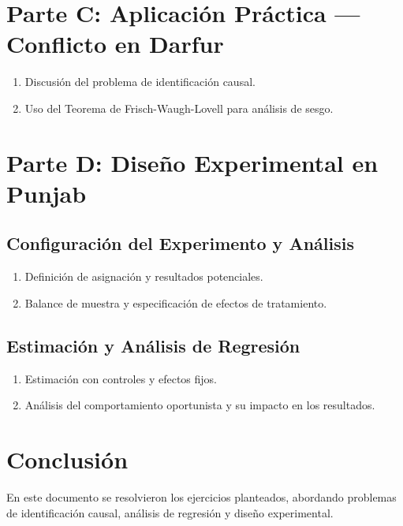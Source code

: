 \documentclass[12pt, letter]{article}
\begin{document}
               








                




\section{Parte C: Aplicación Práctica — Conflicto en Darfur}
\begin{enumerate}[label=C.\arabic*]
    \item Discusión del problema de identificación causal.
    \item Uso del Teorema de Frisch-Waugh-Lovell para análisis de sesgo.
\end{enumerate}




\section{Parte D: Diseño Experimental en Punjab}
\subsection{Configuración del Experimento y Análisis}
\begin{enumerate}[label=D.\arabic*]
    \item Definición de asignación y resultados potenciales.
    \item Balance de muestra y especificación de efectos de tratamiento.
\end{enumerate}

\subsection{Estimación y Análisis de Regresión}
\begin{enumerate}[label=D.\arabic*]
    \item Estimación con controles y efectos fijos.
    \item Análisis del comportamiento oportunista y su impacto en los resultados.
\end{enumerate}

\section*{Conclusión}
\noindent En este documento se resolvieron los ejercicios planteados, abordando problemas de identificación causal, análisis de regresión y diseño experimental.
\end{document}
